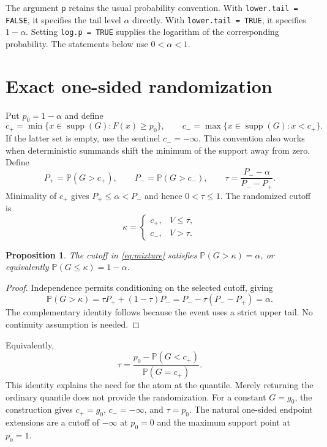 \documentclass[11pt,letterpaper]{article}
\newtheorem{proposition}{Proposition}[section]
\DeclareMathOperator{\supp}{supp}
\newcommand{\Pbb}{\mathbb P}
\begin{document}
The argument \texttt{p} retains the usual probability convention. With
\texttt{lower.tail = FALSE}, it specifies the tail level $\alpha$ directly.
With \texttt{lower.tail = TRUE}, it specifies $1-\alpha$. Setting
\texttt{log.p = TRUE} supplies the logarithm of the corresponding probability.
The statements below use $0<\alpha<1$.

\section{Exact one-sided randomization}

Put $p_0=1-\alpha$ and define
\[
c_+=\min\{x\in\supp(G):F(x)\ge p_0\},\qquad
c_-=\max\{x\in\supp(G):x<c_+\}.
\]
If the latter set is empty, use the sentinel $c_-=-\infty$. This convention
also works when deterministic summands shift the minimum of the support
away from zero. Define
\begin{equation}\label{eq:one-sided-P}
P_+=\Pbb(G>c_+),\qquad P_-=\Pbb(G>c_-),\qquad
\tau=\frac{P_--\alpha}{P_--P_+}.
\end{equation}
Minimality of $c_+$ gives $P_+\le\alpha<P_-$ and hence $0<\tau\le1$.
The randomized cutoff is
\begin{equation}\label{eq:mixture}
\kappa=\begin{cases}
c_+,&V\le\tau,\\
c_-,&V>\tau.
\end{cases}
\end{equation}

\begin{proposition}\label{prop:one-sided}
The cutoff in \eqref{eq:mixture} satisfies
$\Pbb(G>\kappa)=\alpha$, or equivalently
$\Pbb(G\le\kappa)=1-\alpha$.
\end{proposition}
\begin{proof}
Independence permits conditioning on the selected cutoff, giving
\[
\Pbb(G>\kappa)=\tau P_++(1-\tau)P_-
 =P_--\tau(P_--P_+)=\alpha.
\]
The complementary identity follows because the event uses a strict upper
tail. No continuity assumption is needed.
\end{proof}

Equivalently,
\[
\tau=\frac{p_0-\Pbb(G<c_+)}{\Pbb(G=c_+)}.
\]
This identity explains the need for the atom at the quantile. Merely
returning the ordinary quantile does not provide the randomization. For a
constant $G=g_0$, the construction gives $c_+=g_0$, $c_-=-\infty$, and
$\tau=p_0$. The natural one-sided endpoint extensions are a cutoff of
$-\infty$ at $p_0=0$ and the maximum support point at $p_0=1$.
\end{document}
